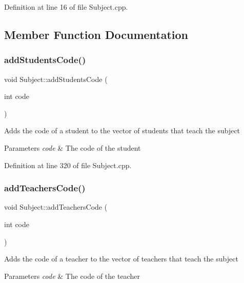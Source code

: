 Definition at line 16 of file Subject.\+cpp.



\subsection{Member Function Documentation}
\mbox{\label{classSubject_afa7d78b9fed5b72cfebf3d19fe03d22f}} 
\subsubsection{\texorpdfstring{add\+Students\+Code()}{addStudentsCode()}}
{\footnotesize\ttfamily void Subject\+::add\+Students\+Code (\begin{DoxyParamCaption}\item[{int}]{code }\end{DoxyParamCaption})}

Adds the code of a student to the vector of students that teach the subject 
\begin{DoxyParams}{Parameters}
{\em code} & The code of the student \\
\hline
\end{DoxyParams}


Definition at line 320 of file Subject.\+cpp.

\mbox{\label{classSubject_a1799fa0aaa5f81dd370bab999be15c43}} 
\subsubsection{\texorpdfstring{add\+Teachers\+Code()}{addTeachersCode()}}
{\footnotesize\ttfamily void Subject\+::add\+Teachers\+Code (\begin{DoxyParamCaption}\item[{int}]{code }\end{DoxyParamCaption})}

Adds the code of a teacher to the vector of teachers that teach the subject 
\begin{DoxyParams}{Parameters}
{\em code} & The code of the teacher \\
\hline
\end{DoxyParams}


